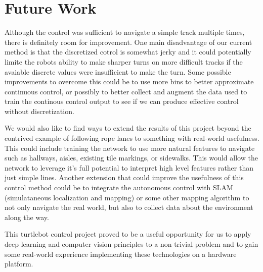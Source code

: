 \section{Future Work}
\label{sec:future_work}
Although the control was sufficient to navigate a simple track multiple times, there is definitely room for improvement. One main disadvantage of our current method is that the discretized cotrol is somewhat jerky and it could potentially limite the robots ability to make sharper turns on more difficult tracks if the avaiable discrete values were insufficient to make the turn. Some possible improvements to overcome this could be to use more bins to better approximate continuous control, or possibly to better collect and augment the data used to train the continous control output to see if we can produce effective control without discretization.

We would also like to find ways to extend the results of this project beyond the contrived example of following rope lanes to something with real-world usefulness. This could include training the network to use more natural features to navigate such as hallways, aisles, existing tile markings, or sidewalks. This would allow the network to leverage it's full potential to interpret high level features rather than just simple lines. Another extension that could improve the usefulness of this control method could be to integrate the autonomous control with SLAM (simulataneous localization and mapping) or some other mapping algorithm to not only navigate the real world, but also to collect data about the environment along the way.

This turtlebot control project proved to be a useful opportunity for us to apply deep learning and computer vision principles to a non-trivial problem and to gain some real-world experience implementing these technologies on a hardware platform.
